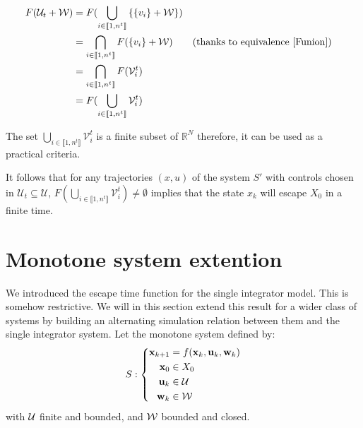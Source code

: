 \begin{align*}
F(\mathcal{U}_t + \mathcal{W}) &= F(\bigcup_{i\in \llbracket 1,n^t \rrbracket} \left \{ \left \{ v_i \right \} + \mathcal{W} \right \} ) \\
&= \bigcap_{i\in \llbracket 1,n^t \rrbracket} F(\left \{ v_i \right \} + \mathcal{W}) && \text{(thanks to equivalence \ref{Funion})}\\
&= \bigcap_{i\in \llbracket 1,n^t \rrbracket} F(\mathcal{V}^t_i) \\
&= F( \bigcup_{i\in \llbracket 1,n^t \rrbracket} \mathcal{V}^t_i) \\
\end{align*}

The set $\bigcup_{i\in \llbracket 1,n^t \rrbracket} \mathcal{V}^t_i$ is a finite subset of $\mathbb{R}^N$ therefore, it can be used as a practical criteria.

It follows that for any trajectories $(x,u)$ of the system $S'$ with controls chosen in $\mathcal{U}_t \subseteq \mathcal{U}$, $F( \bigcup_{i\in \llbracket 1,n^t \rrbracket} \mathcal{V}^t_i) \neq \emptyset$ implies that the state $x_k$ will escape $X_0$ in a finite time.

\section{Monotone system extention}\label{monotone}
We introduced the escape time function for the single integrator model. This is somehow restrictive. We will in this section extend this result for a wider class of systems by building an alternating simulation relation between them and the single integrator system.
Let the monotone system defined by:
\begin{equation}
S:\left\{
\begin{split}
 \mathbf{x}_{k+1} &= f( \mathbf{x}_k, \mathbf{u}_k, \mathbf{w}_k)\\
 \mathbf{x}_0 &\in X_0\\
 \mathbf{u}_k &\in \mathcal{U}\\
 \mathbf{w}_k &\in \mathcal{W}\\
\end{split}
\right.
\end{equation}
with $\mathcal{U}$ finite and bounded, and $\mathcal{W}$ bounded and closed.

